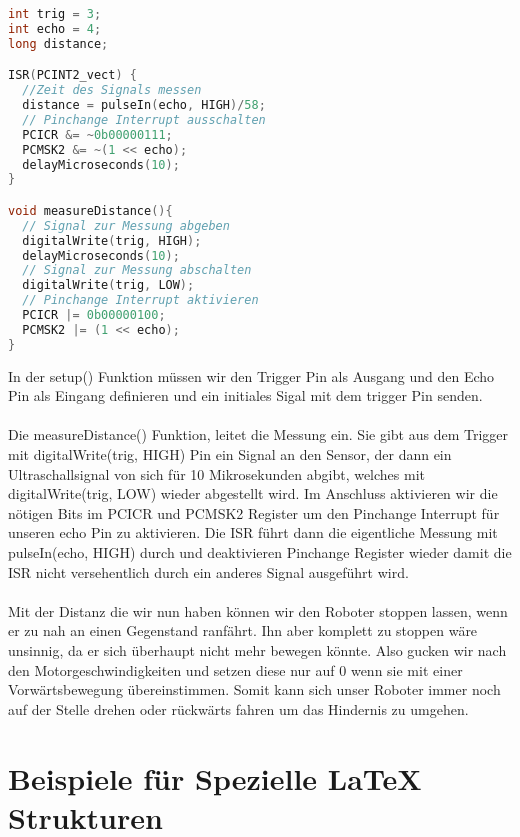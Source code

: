 \documentclass[12pt]{article}
\begin{document}
\begin{file}[HC-SR04]
		
        \begin{lstlisting}[language=C++, inputencoding={utf8}, extendedchars=false]   
int trig = 3;
int echo = 4; 
long distance;        

ISR(PCINT2_vect) {
  //Zeit des Signals messen
  distance = pulseIn(echo, HIGH)/58;
  // Pinchange Interrupt ausschalten
  PCICR &= ~0b00000111;
  PCMSK2 &= ~(1 << echo);   
  delayMicroseconds(10);  
}

void measureDistance(){
  // Signal zur Messung abgeben
  digitalWrite(trig, HIGH);  
  delayMicroseconds(10);
  // Signal zur Messung abschalten
  digitalWrite(trig, LOW); 
  // Pinchange Interrupt aktivieren
  PCICR |= 0b00000100;
  PCMSK2 |= (1 << echo);     
}
        \end{lstlisting}
        
\end{file}
In der setup() Funktion müssen wir den Trigger Pin als Ausgang und den Echo Pin als Eingang definieren und ein initiales Sigal mit dem trigger Pin senden.\\
\\
Die measureDistance() Funktion, leitet die Messung ein. Sie gibt aus dem Trigger mit digitalWrite(trig, HIGH) Pin ein Signal an den Sensor, der dann ein Ultraschallsignal von sich für 10 Mikrosekunden abgibt, welches mit digitalWrite(trig, LOW) wieder abgestellt wird. Im Anschluss aktivieren wir die nötigen Bits im PCICR und PCMSK2 Register um den Pinchange Interrupt für unseren echo Pin zu aktivieren. Die ISR führt dann die eigentliche Messung mit pulseIn(echo, HIGH) durch und deaktivieren Pinchange Register wieder damit die ISR nicht versehentlich durch ein anderes Signal ausgeführt wird.\\
\\
Mit der Distanz die wir nun haben können wir den Roboter stoppen lassen, wenn er zu nah an einen Gegenstand ranfährt. Ihn aber komplett zu stoppen wäre unsinnig, da er sich überhaupt nicht mehr bewegen könnte. Also gucken wir nach den Motorgeschwindigkeiten und setzen diese nur auf 0 wenn sie mit einer Vorwärtsbewegung übereinstimmen. Somit kann sich unser Roboter immer noch auf der Stelle drehen oder rückwärts fahren um das Hindernis zu umgehen. 
\newpage
\section{Beispiele für Spezielle LaTeX Strukturen}
\end{document}
